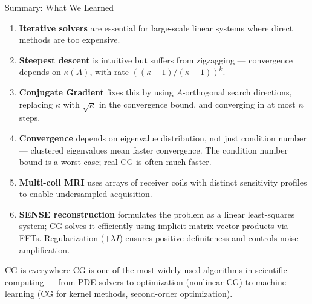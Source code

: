 \documentclass[aspectratio=169]{beamer}
\begin{document}
\begin{frame}{Summary: What We Learned}
    \begin{enumerate}
        \item \textbf{Iterative solvers} are essential for large-scale linear systems
              where direct methods are too expensive.

        \item \textbf{Steepest descent} is intuitive but suffers from zigzagging
              --- convergence depends on $\kappa(A)$, with rate $((\kappa-1)/(\kappa+1))^k$.

        \item \textbf{Conjugate Gradient} fixes this by using $A$-orthogonal
              search directions, replacing $\kappa$ with $\sqrt{\kappa}$ in the
              convergence bound, and converging in at most $n$ steps.

        \item \textbf{Convergence} depends on eigenvalue distribution, not just
              condition number --- clustered eigenvalues mean faster convergence.
              The condition number bound is a worst-case; real CG is often much faster.

        \item \textbf{Multi-coil MRI} uses arrays of receiver coils with distinct
              sensitivity profiles to enable undersampled acquisition.

        \item \textbf{SENSE reconstruction} formulates the problem as a linear
              least-squares system; CG solves it efficiently using implicit
              matrix-vector products via FFTs. Regularization ($+\lambda I$) ensures
              positive definiteness and controls noise amplification.
    \end{enumerate}

    \vspace{0.2cm}
    \begin{block}{CG is everywhere}
        CG is one of the most widely used algorithms in scientific computing ---
        from PDE solvers to optimization (nonlinear CG) to machine learning
        (CG for kernel methods, second-order optimization).
    \end{block}
\end{frame}
\end{document}
